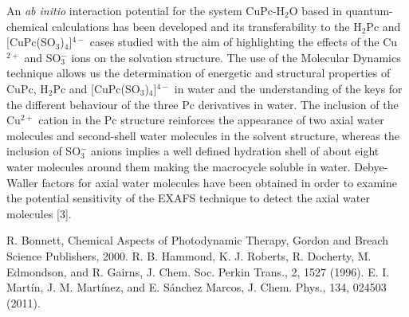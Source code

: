 An \textit{ab initio} interaction potential for the system CuPc-H$_{2}$O based in quantum-chemical calculations
has been developed and its transferability to the H$_{2}$Pc and [CuPc(SO$_{3}$)$_{4}$]$^{4-}$ cases studied
with the aim of highlighting the effects of the Cu$^{2+}$ and SO$_{3}^{-}$ ions on the solvation structure.
The use of the Molecular Dynamics technique allows us the determination of energetic and structural properties of
CuPc, H$_{2}$Pc and [CuPc(SO$_{3}$)$_{4}$]$^{4-}$ in water and the understanding of the keys
for the different behaviour of the three Pc derivatives in water. The inclusion of the Cu$^{2+}$ cation
in the Pc structure reinforces the appearance of two axial water molecules and second-shell water
molecules in the solvent structure, whereas the inclusion of SO$_{3}^{-}$ anions implies a well defined
hydration shell of about eight water molecules around them making the macrocycle soluble in water.
Debye-Waller factors for axial water molecules have been obtained in order to examine the
potential sensitivity of the EXAFS technique to detect the axial water molecules [3].
\newpage
\begin{figure}[h]
 \centerline{}
 \caption[]{ }
\end{figure}
{\footnotesize
\noindent
[1] R. Bonnett, Chemical Aspects of Photodynamic Therapy, Gordon and Breach Science Publishers, 2000.
\newline
[2] R. B. Hammond, K. J. Roberts, R. Docherty, M. Edmondson, and R. Gairns, J. Chem. Soc. Perkin Trans., 2, 1527
(1996).
\newline
[3] E. I. Martín, J. M. Martínez, and E. Sánchez Marcos, J. Chem. Phys., 134, 024503 (2011).
}
\newpage
\setcounter{figure}{0}
